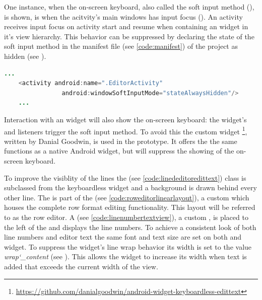 One instance, when the on-screen keyboard, also called the soft input method (\cite{android_softinputmethod}), is shown, is when the acitvity's main windows has input focus (\cite{android_windowsoftinputmode_docs}). An activity receives input focus on activity start and resume when containing an  widget in it's view hierarchy. This behavior can be suppressed by declaring the state of the soft input method in the manifest file (see \ref{code:manifest}) of the project as hidden (see ).

\begin{lstlisting}[language=JAVA, caption=Declaring on-screen keyboard hidden in manifest file., label=lst:inputstate_hidden_manifest]
	...
	<activity android:name=".EditorActivity"
	            android:windowSoftInputMode="stateAlwaysHidden"/>
	...
\end{lstlisting}

Interaction with an  widget will also show the on-screen keyboard: the widget's  and  listeners trigger the soft input method. To avoid this the custom widget \footnote{\url{https://github.com/danialgoodwin/android-widget-keyboardless-edittext}}, written by Danial Goodwin, is used in the prototype. It offers the the same functions as a native Android  widget, but will suppress the showing of the on-screen keyboard.

To improve the visiblity of the lines the  (see \ref{code:linededitoredittext}) class is subclassed from the keyboardless  widget and a background is drawn behind every other line. The  is part of the  (see \ref{code:roweditorlinearlayout}), a custom  which houses the complete row format editing functionality. This layout will be referred to as the row editor. A  (see \ref{code:linenumbertextview}), a custom , is placed to the left of the  and displays the line numbers. To achieve a consistent look of both line numbers and editor text the same font and text size are set on both  and  widget.
To suppress the  widget's line wrap behavior its width is set to the value \textit{wrap\char`_content} (see ). This allows the widget to increase its width when text is added that exceeds the current width of the view.

